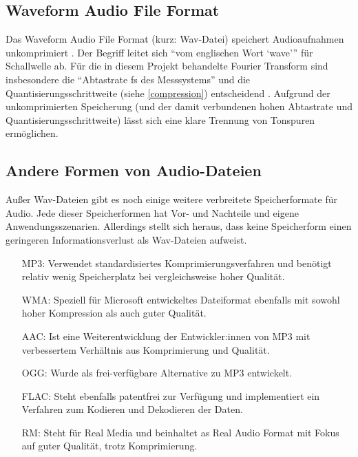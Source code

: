 %
\subsection{Waveform Audio File Format}
%

Das Waveform Audio File Format (kurz: Wav-Datei) speichert Audioaufnahmen unkomprimiert \parencite{what_is_a_wav_file}. Der Begriff leitet sich \enquote{vom englischen Wort \enquote{wave}} \parencite{wav} für Schallwelle ab. Für die in diesem Projekt behandelte Fourier Transform sind insbesondere die \enquote{Abtastrate fs des Messsystems} und die Quantisierungsschrittweite (siehe \cref{compression}) entscheidend  \parencite{FFT_grundlagen}. Aufgrund der unkomprimierten Speicherung (und der damit verbundenen hohen Abtastrate und Quantisierungsschrittweite) lässt sich eine klare Trennung von Tonspuren ermöglichen.


%
\subsection{Andere Formen von Audio-Dateien}
\label{audio_representations}
%

Außer Wav-Dateien gibt es noch einige weitere verbreitete Speicherformate für Audio. Jede dieser Speicherformen hat Vor- und Nachteile und eigene Anwendungsszenarien. Allerdings stellt sich heraus, dass keine Speicherform einen geringeren Informationsverlust als Wav-Dateien aufweist.

%
\begin{itemize}
    \item [MP3:] Verwendet standardisiertes Komprimierungsverfahren und benötigt relativ wenig Speicherplatz bei vergleichsweise hoher Qualität.
    \item [WMA:] Speziell für Microsoft entwickeltes Dateiformat ebenfalls mit sowohl hoher Kompression als auch guter Qualität.
    \item [AAC:] Ist eine Weiterentwicklung der Entwickler:innen von MP3 mit verbessertem Verhältnis aus Komprimierung und Qualität.
    \item [OGG:] Wurde als frei-verfügbare Alternative zu MP3 entwickelt.
    \item [FLAC:] Steht ebenfalls patentfrei zur Verfügung und implementiert ein Verfahren zum Kodieren und Dekodieren der Daten.
    \item [RM:] Steht für Real Media und beinhaltet as Real Audio Format mit Fokus auf guter Qualität, trotz Komprimierung.
\end{itemize}
%


